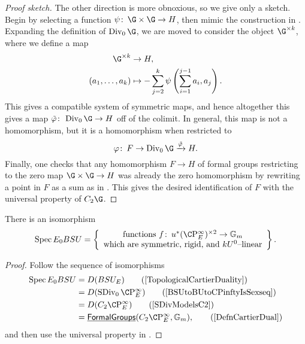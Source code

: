 \begin{proof}[Proof sketch]
The other direction is more obnoxious, so we give only a sketch.  Begin by selecting a function $\psi\co \G \times \G \to H$, then mimic the construction in .  Expanding the definition of $\Div_0 \G$, we are moved to consider the object $\G^{\times k}$, where we define a map
\begin{align*}
\G^{\times k} & \to H, \\
(a_1, \ldots, a_k) & \mapsto -\sum_{j=2}^k \psi\left(\sum_{i=1}^{j-1} a_i, a_j \right).
\end{align*}
This gives a compatible system of symmetric maps, and hence altogether this gives a map $\tilde\phi\co\Div_0 \G \to H$ off of the colimit.  In general, this map is not a homomorphism, but it is a homomorphism when restricted to \[\phi\co F \to \Div_0 \G \xrightarrow{\tilde\phi} H.\]  Finally, one checks that any homomorphism $F \to H$ of formal groups restricting to the zero map $\G \times \G \to H$ was already the zero homomorphism by rewriting a point in $F$ as a sum as in .  This gives the desired identification of $F$ with the universal property of $C_2 \G$.
\end{proof}

\begin{corollary}\label{CharacterizationOfBSUUpperE}
There is an isomorphism \[\Spec E_0 BSU = \left\{\begin{array}{c} \text{functions $f\co u^* (\CP^\infty_E)^{\times 2} \to \Gm$} \\ \text{which are symmetric, rigid, and $kU^0$--linear} \end{array}\right\}.\]
\end{corollary}
\begin{proof}
Follow the sequence of isomorphisms
\begin{align*}
\Spec E_0 BSU & = D(BSU_E) \tag{\Cref{TopologicalCartierDuality}} \\
& = D(\SDiv_0 \CP^\infty_E) \tag{\Cref{BSUtoBUtoCPinftyIsSexseq}} \\
& = D(C_2 \CP^\infty_E) \tag{\Cref{SDivModelsC2}} \\
& = \InternalHom{FormalGroups}(C_2 \CP^\infty_E, \Gm), \tag{\Cref{DefnCartierDual}}
\end{align*}
and then use the universal property in .
\end{proof}

